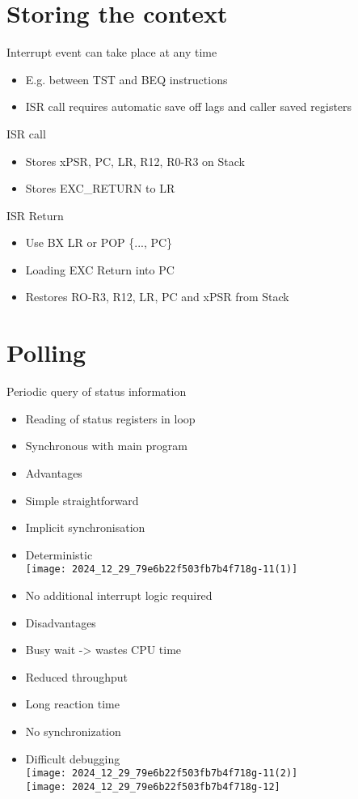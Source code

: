\section*{Storing the context}
Interrupt event can take place at any time

\begin{itemize}
  \item E.g. between TST and BEQ instructions
  \item ISR call requires automatic save off lags and caller saved registers
\end{itemize}

ISR call

\begin{itemize}
  \item Stores xPSR, PC, LR, R12, R0-R3 on Stack
  \item Stores EXC\_RETURN to LR
\end{itemize}

ISR Return

\begin{itemize}
  \item Use BX LR or POP \{..., PC\}
  \item Loading EXC Return into PC
  \item Restores RO-R3, R12, LR, PC and xPSR from Stack
\end{itemize}

\section*{Polling}
Periodic query of status information

\begin{itemize}
  \item Reading of status registers in loop
  \item Synchronous with main program
  \item Advantages
  \item Simple straightforward
  \item Implicit synchronisation
  \item Deterministic\\
\texttt{[image: 2024\_12\_29\_79e6b22f503fb7b4f718g-11(1)]}
  \item No additional interrupt logic required
  \item Disadvantages
  \item Busy wait -> wastes CPU time
  \item Reduced throughput
  \item Long reaction time
  \item No synchronization
  \item Difficult debugging\\
\texttt{[image: 2024\_12\_29\_79e6b22f503fb7b4f718g-11(2)]}\\
\texttt{[image: 2024\_12\_29\_79e6b22f503fb7b4f718g-12]}
\end{itemize}